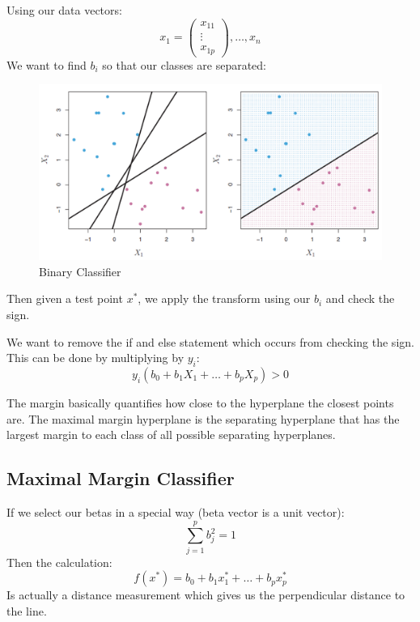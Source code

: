 \documentclass[../Main.tex]{subfiles}
\begin{document}

Using our data vectors:
\begin{equation*}
    x_1 = \begin{pmatrix}
        x_{11} \\
        \vdots \\
        x_{1p}
    \end{pmatrix}, \dots , x_n
\end{equation*}
We want to find \(b_i\) so that our classes are separated:
\begin{figure}[H]
    \centering
    \includegraphics[width=0.35\linewidth]{Images/max-margin-classifier.png}
    \caption{Binary Classifier}
\end{figure}

Then given a test point \(x^*\), we apply the transform using our \(b_i\) and
check the sign.

We want to remove the if and else statement which occurs from checking the sign.
This can be done by multiplying by \(y_i\):
\begin{equation*}
    y_i (b_0 + b_1 X_1 + \dots + b_p X_p) > 0
\end{equation*}

The margin basically quantifies how close to the hyperplane the closest points are.
The maximal margin hyperplane is the separating hyperplane that has the largest margin to each class of all 
possible separating hyperplanes.

\subsection{Maximal Margin Classifier}
If we select our betas in a special way (beta vector is a unit vector):
\begin{equation*}
    \sum_{j=1}^{p} b_j^2 = 1
\end{equation*}
Then the calculation:
\begin{equation*}
    f(x^*) = b_0 + b_1 x_1^* + \dots + b_p x_p^*
\end{equation*}
Is actually a distance measurement which gives us the perpendicular distance to the line.
\end{document}

